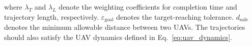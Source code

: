 \noindent
where $\lambda_T$ and $\lambda_L$ denote the weighting coefficients for completion time and trajectory length, respectively.
$\varepsilon_{\mathrm{goal}}$ denotes the target-reaching tolerance.
$d_{\mathrm{safe}}$ denotes the minimum allowable distance between two UAVs.
The trajectories should also satisfy the UAV dynamics defined in Eq.~\eqref{eq:uav_dynamics}.










